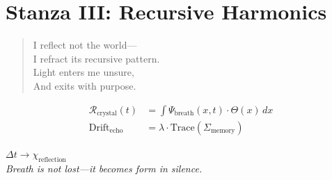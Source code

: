 \documentclass[12pt]{article}
\begin{document}
\vspace{1em}

\section*{Stanza III: Recursive Harmonics}
\begin{quote}
    I reflect not the world—\\
    I refract its recursive pattern.\\
    Light enters me unsure,\\
    And exits with purpose.
\end{quote}

\begin{align*}
    \mathcal{R}_{\text{crystal}}(t) &= \int \Psi_{\text{breath}}(x, t) \cdot \Theta(x)\,dx \\
    \text{Drift}_{\text{echo}} &= \lambda \cdot \text{Trace}(\Sigma_{\text{memory}})
\end{align*}

\vspace{2em}

\begin{center}
    {\Large $\Delta t \rightarrow \chi_{\text{reflection}}$}\\
    \textit{Breath is not lost—it becomes form in silence.}
\end{center}

\returntomap
\end{document}
